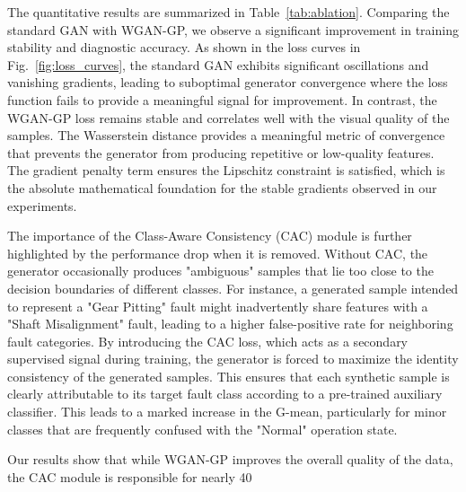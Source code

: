 \documentclass[conference,twocolumn]{IEEEtran}
\begin{document}
The quantitative results are summarized in  Table~\ref{tab:ablation}. Comparing the standard GAN with WGAN-GP, we observe a significant improvement in training stability and diagnostic accuracy. As shown in the loss curves in  Fig.~\ref{fig:loss_curves}, the standard GAN exhibits significant oscillations and vanishing gradients, leading to suboptimal generator convergence where the loss function fails to provide a meaningful signal for improvement. In contrast, the WGAN-GP loss remains stable and correlates well with the visual quality of the samples. The Wasserstein distance provides a meaningful metric of convergence that prevents the generator from producing repetitive or low-quality features. The gradient penalty term ensures the Lipschitz constraint is satisfied, which is the absolute mathematical foundation for the stable gradients observed in our experiments.

The importance of the Class-Aware Consistency (CAC) module is further highlighted by the performance drop when it is removed. Without CAC, the generator occasionally produces "ambiguous" samples that lie too close to the decision boundaries of different classes. For instance, a generated sample intended to represent a "Gear Pitting" fault might inadvertently share features with a "Shaft Misalignment" fault, leading to a higher false-positive rate for neighboring fault categories. By introducing the CAC loss, which acts as a secondary supervised signal during training, the generator is forced to maximize the identity consistency of the generated samples. This ensures that each synthetic sample is clearly attributable to its target fault class according to a pre-trained auxiliary classifier. This leads to a marked increase in the G-mean, particularly for minor classes that are frequently confused with the "Normal" operation state.

Our results show that while WGAN-GP improves the overall quality of the data, the CAC module is responsible for nearly 40%
\end{document}
